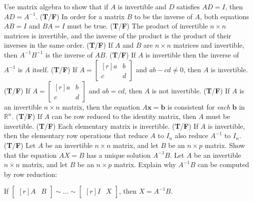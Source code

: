 \documentclass[11pt,answers]{exam} %
\renewcommand{\vec}[1]{\mathbf{#1}}
\newcommand{\mat}[1]{\begin{bmatrix*}[r] #1 \end{bmatrix*}}
\begin{document}
\begin{questions}
    \question Use matrix algebra to show that if $A$ is invertible and $D$ satisfies $AD = I$, then $A D = A^{-1}$.
    \question (\textbf{T}/\textbf{F}) In order for a matrix $B$ to be the inverse of $A$, both equations $AB = I$ and $BA = I$ must be true.
    \question (\textbf{T}/\textbf{F}) The product of invertible $n \times n$ matrices is invertible, and the inverse of the product is the product of their inverses in the same order.
    \question (\textbf{T}/\textbf{F}) If $A$ and $B$ are $n \times n$ matrices and invertible, then $A^{-1}B^{-1}$ is the inverse of $AB$.
    \question (\textbf{T}/\textbf{F}) If $A$ is invertible then the inverse of $A^{-1}$ is $A$ itself.
    \question (\textbf{T}/\textbf{F}) If $A = \mat{a & b \\ c & d}$ and $ab-cd \neq 0$, then $A$ is invertible.
    \question (\textbf{T}/\textbf{F}) If $A = \mat{a & b \\ c & d}$ and $ab=cd$, then $A$ is not invertible.
    \question (\textbf{T}/\textbf{F}) If $A$ is an invertible $n \times n$ matrix, then the equation $A\vec{x} = \vec{b}$ is consistent for \emph{each} $\vec{b}$ in $\mathbb{R}^n$.
    \question (\textbf{T}/\textbf{F}) If $A$ can be row reduced to the identity matrix, then $A$ must be invertible.
    \question (\textbf{T}/\textbf{F}) Each elementary matrix is invertible.
    \question (\textbf{T}/\textbf{F}) If $A$ is invertible, then the elementary row operations that reduce $A$ to $I_n$ also reduce $A^{-1}$ to $I_n$.
    \question (\textbf{T}/\textbf{F}) Let $A$ be an invertible $n \times n$ matrix, and let $B$ be an $n \times p$ matrix. Show that the equation $AX = B$ has a unique solution $A^{-1} B$.
    \vspace{1cm}
    \question Let $A$ be an invertible $n \times n$ matrix, and let $B$ be an $n \times p$ matrix. Explain why $A^{-1}B$ can be computed by row reduction:
    \begin{center} If $\mat{A & B} \sim \ldots \sim \mat{I & X}$, then $X = A^{-1}B$.\end{center}

\end{questions}
\end{document}
